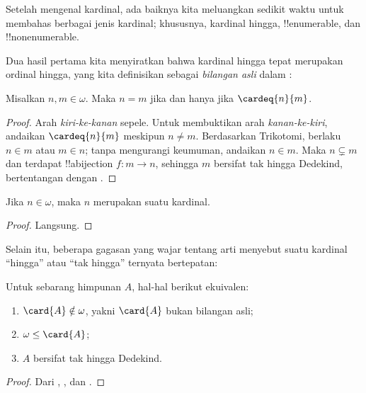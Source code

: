 \documentclass[../../../include/open-logic-section]{subfiles}
\begin{document}

Setelah mengenal kardinal, ada baiknya kita meluangkan sedikit
waktu untuk membahas berbagai jenis kardinal; khususnya, kardinal hingga,
!!{enumerable}, dan !!{nonenumerable}.

Dua hasil pertama kita menyiratkan bahwa kardinal hingga tepat merupakan
ordinal hingga, yang kita definisikan sebagai \emph{bilangan asli} dalam
:

\begin{prop}
Misalkan $n, m \in \omega$. Maka $n = m$ jika dan hanya jika
$\cardeq{n}{m}$.
\end{prop}

\begin{proof}
Arah \emph{kiri-ke-kanan} sepele. Untuk membuktikan arah
\emph{kanan-ke-kiri}, andaikan $\cardeq{n}{m}$ meskipun $n \neq m$.
Berdasarkan Trikotomi, berlaku $n \in m$ atau $m \in n$; tanpa mengurangi
keumuman, andaikan $n \in m$. Maka $n \subsetneq m$ dan terdapat
!!a{bijection} $f \colon m \to n$, sehingga $m$ bersifat tak hingga
Dedekind, bertentangan dengan
.
\end{proof}

\begin{cor}
Jika $n \in \omega$, maka $n$ merupakan suatu kardinal.
\end{cor}

\begin{proof}
Langsung.
\end{proof}
\noindent
Selain itu, beberapa gagasan yang wajar tentang arti menyebut suatu kardinal
``hingga'' atau ``tak hingga'' ternyata bertepatan:
\begin{thm}Untuk sebarang himpunan $A$, hal-hal berikut ekuivalen:
\begin{enumerate}
	\item{} $\card{A} \notin \omega$, yakni
	$\card{A}$ bukan bilangan asli;
	\item{} $\omega \leq \card{A}$;
	\item{} $A$ bersifat tak hingga Dedekind.
\end{enumerate}
\end{thm}

\begin{proof}
Dari ,
, dan
.
\end{proof}
\end{document}
